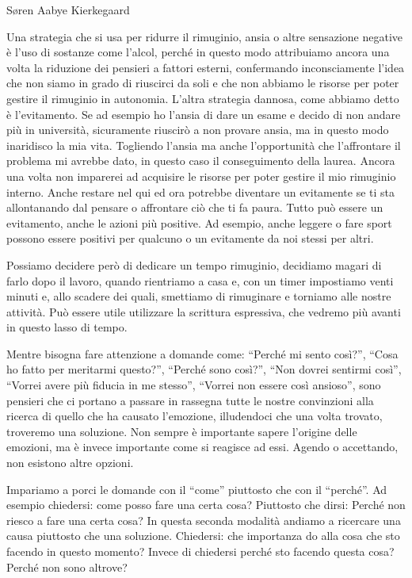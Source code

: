 \documentclass[12pt]{book} %
\begin{document}
Søren Aabye Kierkegaard

Una strategia che si usa per ridurre il rimuginio, ansia o altre sensazione negative è l'uso di sostanze come l'alcol,
perché in questo modo attribuiamo ancora una volta la riduzione dei pensieri a fattori esterni, confermando
inconsciamente l'idea che non siamo in grado di riuscirci da soli e che non abbiamo le risorse per
poter gestire il rimuginio in autonomia. L'altra strategia dannosa, come abbiamo detto è
l'evitamento. Se ad esempio ho l'ansia di dare un esame e decido di non
andare più in università, sicuramente riuscirò a non provare ansia, ma in questo modo inaridisco la mia vita. Togliendo
l'ansia ma anche l'opportunità che l'affrontare il problema mi avrebbe dato, in questo caso il conseguimento della
laurea. Ancora una volta non imparerei ad acquisire le risorse per poter gestire il mio rimuginio interno.
Anche restare nel qui ed ora potrebbe diventare un evitamente se ti sta allontanando dal pensare o affrontare ciò che ti fa paura. 
Tutto può essere un evitamento, anche le azioni più positive. Ad esempio, anche leggere o fare sport possono essere positivi per qualcuno o un evitamente da noi stessi per altri.

Possiamo decidere però di dedicare un tempo rimuginio, decidiamo magari di farlo dopo il lavoro, quando rientriamo a
casa e, con un timer impostiamo venti minuti e, allo scadere dei quali, smettiamo di rimuginare e torniamo alle nostre
attività. Può essere utile utilizzare la scrittura espressiva, che vedremo più avanti in questo lasso di tempo.

Mentre bisogna fare attenzione a domande come: “Perché mi sento così?”, “Cosa ho fatto per meritarmi questo?”, “Perché
sono così?”, “Non dovrei sentirmi così”, “Vorrei avere più fiducia in me stesso”, “Vorrei non essere così ansioso”,
sono pensieri che ci portano a passare in rassegna tutte le nostre convinzioni alla ricerca di quello che ha causato
l'emozione, illudendoci che una volta trovato, troveremo una soluzione. Non sempre è importante
sapere l'origine delle emozioni, ma è invece importante come si reagisce ad essi. Agendo o
accettando, non esistono altre opzioni.

Impariamo a porci le domande con il “come” piuttosto che con il “perché”. Ad esempio chiedersi: come posso fare una
certa cosa? Piuttosto che dirsi: Perché non riesco a fare una certa cosa? In questa seconda modalità andiamo a
ricercare una causa piuttosto che una soluzione. Chiedersi: che importanza do alla cosa che sto facendo in questo momento?
Invece di chiedersi perché sto facendo questa cosa? Perché non sono altrove? 
\end{document}
